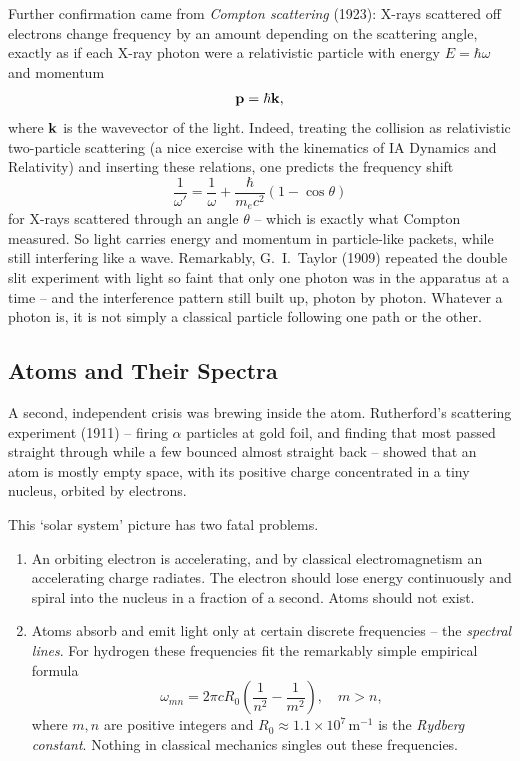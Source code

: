\documentclass[a4paper]{scrartcl}
\begin{document}
Further confirmation came from \emph{Compton scattering} (1923): X-rays scattered off electrons change frequency by an amount depending on the scattering angle, exactly as if each X-ray photon were a relativistic particle with energy $E = \hbar \omega$ and momentum
$$
\mathbf{p} = \hbar \mathbf{k},
$$
where $\mathbf{k}$ is the wavevector of the light. Indeed, treating the collision as relativistic two-particle scattering (a nice exercise with the kinematics of IA Dynamics and Relativity) and inserting these relations, one predicts the frequency shift
$$
\frac{1}{\omega'} = \frac{1}{\omega} + \frac{\hbar}{m_e c^2}(1 - \cos \theta)
$$
for X-rays scattered through an angle $\theta$ -- which is exactly what Compton measured. So light carries energy and momentum in particle-like packets, while still interfering like a wave. Remarkably, G.\ I.\ Taylor (1909) repeated the double slit experiment with light so faint that only one photon was in the apparatus at a time -- and the interference pattern still built up, photon by photon. Whatever a photon is, it is not simply a classical particle following one path or the other.

\subsection{Atoms and Their Spectra}

A second, independent crisis was brewing inside the atom. Rutherford's scattering experiment (1911) -- firing $\alpha$ particles at gold foil, and finding that most passed straight through while a few bounced almost straight back -- showed that an atom is mostly empty space, with its positive charge concentrated in a tiny nucleus, orbited by electrons.

This `solar system' picture has two fatal problems.
\begin{enumerate}[label=(\roman*)]
    \item An orbiting electron is accelerating, and by classical electromagnetism an accelerating charge radiates. The electron should lose energy continuously and spiral into the nucleus in a fraction of a second. Atoms should not exist.
    \item Atoms absorb and emit light only at certain discrete frequencies -- the \emph{spectral lines}. For hydrogen these frequencies fit the remarkably simple empirical formula
    $$
    \omega_{mn} = 2 \pi c R_0 \left( \frac{1}{n^2} - \frac{1}{m^2} \right), \quad m > n,
    $$
    where $m, n$ are positive integers and $R_0 \approx 1.1 \times 10^7 \, \mathrm{m}^{-1}$ is the \emph{Rydberg constant}. Nothing in classical mechanics singles out these frequencies.
\end{enumerate}
\end{document}
